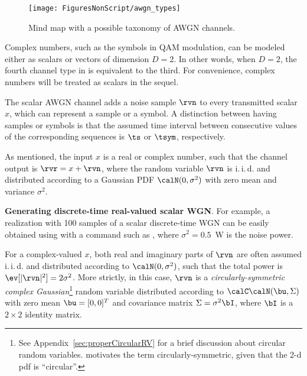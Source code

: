 \begin{figure}[htbp]
\centering
\texttt{[image: FiguresNonScript/awgn\_types]}
\caption{Mind map with a possible taxonomy of AWGN channels.\label{fig:awgn_types}}
\end{figure}

Complex numbers, such as the symbols in QAM modulation, can be modeled either as scalars or vectors of dimension $D=2$. 
In other words, when $D=2$, the fourth channel type in  is equivalent to the 
third. For convenience, complex numbers will be treated as scalars in the sequel.%

The scalar AWGN channel adds a noise sample $\rvn$ to every transmitted scalar $x$, which can represent a sample or a symbol. A distinction between having samples or symbols is that the assumed time interval between consecutive values of the corresponding sequences is $\ts$ or $\tsym$, respectively. 

As mentioned, the input $x$ is a real or complex number, such that the channel output is $\rvr=x+\rvn$, where
the random variable $\rvn$ is i.\,i.\,d. and distributed according to a Gaussian PDF $\calN(0,\sigma^2)$ with zero mean and variance $\sigma^2$. 

\bExample \textbf{Generating discrete-time real-valued scalar WGN}.
For example, a realization with 100 samples of a scalar discrete-time WGN can be easily obtained using {\matlab} with a command such as , where $\sigma^2=0.5$~W is the noise power.
\eExample 

For a complex-valued $x$, both real and imaginary parts of $\rvn$ are often assumed i.\,i.\,d. and distributed according to $\calN(0,\sigma^2)$, such that the total power is $\ev[|\rvn|^2]=2 \sigma^2$. 
More strictly, in this case, $\rvn$ is a \emph{circularly-symmetric complex Gaussian}\footnote{See Appendix~\ref{sec:properCircularRV} for a brief discussion about circular random variables.  motivates the term circularly-symmetric, given that the 2-d pdf is ``circular''.}%
 random variable distributed according to $\calC \calN(\bu,\Sigma)$ with zero mean $\bu=[0,0]^T$ and covariance matrix $\Sigma=\sigma^2 \bI$, where $\bI$ is a $2 \times 2$ identity matrix. 

